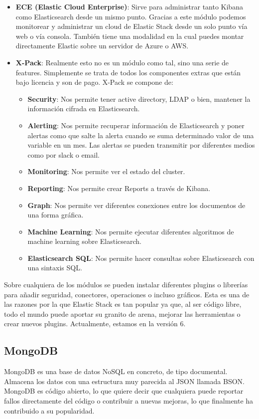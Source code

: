 \begin{itemize}
	\item \textbf{ECE (Elastic Cloud Enterprise)}: Sirve para administrar tanto Kibana como Elasticsearch desde un mismo punto. Gracias a este módulo podemos monitorear y administrar un cloud de Elastic Stack desde un solo punto vía web o vía consola. También tiene una modalidad en la cual puedes montar directamente Elastic sobre un servidor de Azure o AWS.
	\item \textbf{X-Pack}: Realmente esto no es un módulo como tal, sino una serie de features. Simplemente se trata de todos los componentes extras que están bajo licencia y son de pago. X-Pack se compone de:
\begin{itemize}
	\item \textbf{Security}: Nos permite tener active directory, LDAP o bien, mantener la información cifrada en Elasticsearch. 
	\item \textbf{Alerting}: Nos permite recuperar información de Elasticsearch y poner alertas como que salte la alerta cuando se suma determinado valor de una variable en un mes. Las alertas se pueden transmitir por diferentes medios como por slack o email.
	\item \textbf{Monitoring}: Nos permite ver el estado del cluster.
	\item \textbf{Reporting}: Nos permite crear Reports a través de Kibana.
	\item \textbf{Graph}: Nos permite ver diferentes conexiones entre los documentos de una forma gráfica.
	\item \textbf{Machine Learning}: Nos permite ejecutar diferentes algoritmos de machine learning sobre Elasticsearch.
	\item\textbf{ Elasticsearch SQL}: Nos permite hacer consultas sobre Elasticsearch con una sintaxis SQL.
\end{itemize}
\end{itemize}
Sobre cualquiera de los módulos se pueden instalar diferentes plugins o librerías para añadir seguridad, conectores, operaciones o incluso gráficos. Esta es una de las razones por la que Elastic Stack es tan popular ya que, al ser código libre, todo el mundo puede aportar su granito de arena, mejorar las herramientas o crear nuevos plugins. Actualmente, estamos en la versión 6.

\subsection{MongoDB\label{MongoDB}}


MongoDB es una base de datos NoSQL en concreto, de tipo documental. Almacena los datos con una estructura muy parecida al JSON llamada BSON. MongoDB es código abierto, lo que quiere decir que cualquiera puede reportar fallos directamente del código o contribuir a nuevas mejoras, lo que finalmente ha contribuido a su popularidad.

